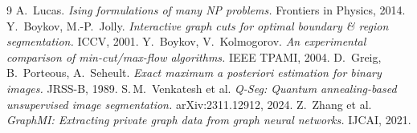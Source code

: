 \documentclass[11pt]{article}
\begin{document}
\begin{thebibliography}{9}
 A.\ Lucas. \emph{Ising formulations of many NP problems.} Frontiers in Physics, 2014.
 Y.\ Boykov, M.-P.\ Jolly. \emph{Interactive graph cuts for optimal boundary \& region segmentation.} ICCV, 2001.
 Y.\ Boykov, V.\ Kolmogorov. \emph{An experimental comparison of min-cut/max-flow algorithms.} IEEE TPAMI, 2004.
 D.\ Greig, B.\ Porteous, A.\ Seheult. \emph{Exact maximum a posteriori estimation for binary images.} JRSS-B, 1989.
 S.\,M.\ Venkatesh et al. \emph{Q-Seg: Quantum annealing-based unsupervised image segmentation.} arXiv:2311.12912, 2024.
 Z.\ Zhang et al. \emph{GraphMI: Extracting private graph data from graph neural networks.} IJCAI, 2021.
\end{thebibliography}
\end{document}
